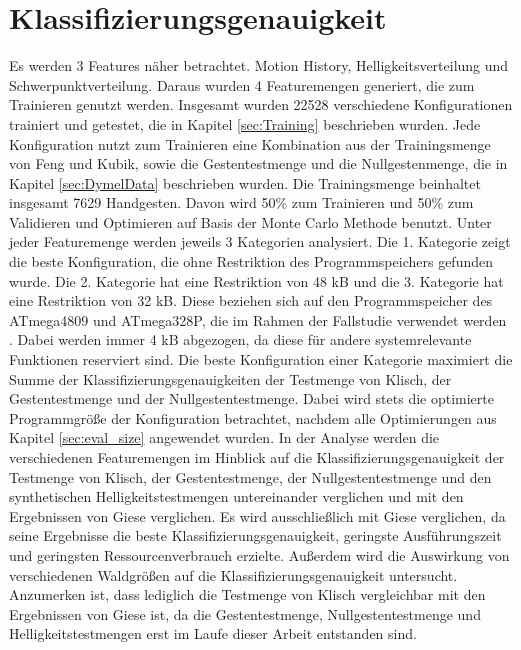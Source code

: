 \section{Klassifizierungsgenauigkeit}
Es werden 3 Features näher betrachtet. Motion History, Helligkeitsverteilung und Schwerpunktverteilung. Daraus wurden 4 Featuremengen generiert, die zum Trainieren genutzt werden. Insgesamt wurden 22528
verschiedene Konfigurationen trainiert und getestet, die in Kapitel \ref{sec:Training} beschrieben wurden. Jede Konfiguration nutzt zum Trainieren eine Kombination aus der Trainingsmenge von Feng und Kubik,
sowie die Gestentestmenge und die Nullgestenmenge, die in Kapitel \ref{sec:DymelData} beschrieben wurden. Die Trainingsmenge beinhaltet insgesamt 7629 Handgesten. Davon wird 50\% zum Trainieren und 50\% zum
Validieren und Optimieren auf Basis der Monte Carlo Methode benutzt.
\newline
\newline
Unter jeder Featuremenge werden jeweils 3 Kategorien analysiert. Die 1. Kategorie zeigt die beste Konfiguration, die ohne Restriktion des Programmspeichers gefunden wurde. Die 2. Kategorie hat eine Restriktion
von 48 kB und die 3. Kategorie hat eine Restriktion von 32 kB. Diese beziehen sich auf den Programmspeicher des ATmega4809 und ATmega328P, die im Rahmen der Fallstudie verwendet werden \cite{venzkeArticle}.
Dabei werden immer 4 kB abgezogen, da diese für andere systemrelevante Funktionen reserviert sind. Die beste Konfiguration einer Kategorie maximiert die Summe
der Klassifizierungsgenauigkeiten der Testmenge von Klisch, der Gestentestmenge und der Nullgestentestmenge. Dabei wird stets die optimierte Programmgröße der Konfiguration betrachtet, nachdem alle Optimierungen aus Kapitel
\ref{sec:eval_size} angewendet wurden.
\newline
\newline
In der Analyse werden die verschiedenen Featuremengen im Hinblick auf die Klassifizierungsgenauigkeit der Testmenge von Klisch, der Gestentestmenge, der Nullgestentestmenge und den synthetischen
Helligkeitstestmengen untereinander verglichen und mit den Ergebnissen von Giese verglichen. Es wird ausschließlich mit Giese verglichen, da seine Ergebnisse die beste Klassifizierungsgenauigkeit,
geringste Ausführungszeit und geringsten Ressourcenverbrauch erzielte. Außerdem wird die Auswirkung von verschiedenen Waldgrößen auf die Klassifizierungsgenauigkeit untersucht. Anzumerken ist, dass
lediglich die Testmenge von Klisch vergleichbar mit den Ergebnissen von Giese ist, da die Gestentestmenge, Nullgestentestmenge und Helligkeitstestmengen erst im Laufe dieser Arbeit entstanden sind.







